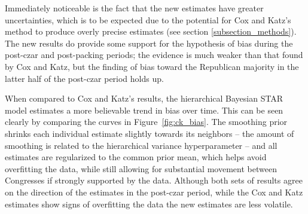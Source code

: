 Immediately noticeable is the fact that the new estimates have greater uncertainties, which is to be expected due to the potential for Cox and Katz's method to produce overly precise estimates  (see section \ref{subsection_methods}). The new results do provide some support for the hypothesis of bias during the post-czar and post-packing periods; the evidence is much weaker than that found by Cox and Katz, but the finding of bias toward the Republican majority in the latter half of the post-czar period holds up. 

When compared to Cox and Katz's results, the hierarchical Bayesian STAR model estimates a more believable trend in bias over time. This can be seen clearly by comparing the curves in Figure~\ref{fig:ck_bias}. The smoothing prior shrinks each individual estimate slightly towards its neighbors -- the amount of smoothing is related to the hierarchical variance hyperparameter -- and all estimates are regularized to the common prior mean, which helps avoid overfitting the data, while still allowing for substantial movement between Congresses if strongly supported by the data. Although both sets of results agree on the direction of the estimates in the post-czar period, while the Cox and Katz estimates show signs of overfitting the data the new estimates are less volatile. 

